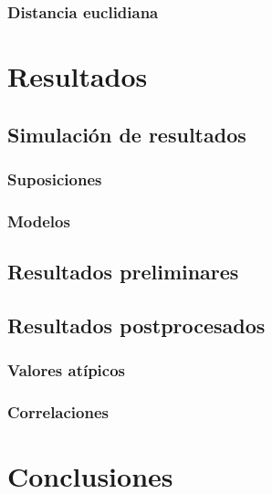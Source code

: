 \documentclass{book}
\begin{document}
\subsection*{Distancia euclidiana}

\chapter{Resultados}
\section{Simulación de resultados}
\subsection{Suposiciones}
\subsection{Modelos}
\section{Resultados preliminares}
\section{Resultados postprocesados}
\subsection{Valores atípicos}
\subsection{Correlaciones}
\chapter{Conclusiones}
\end{document}
